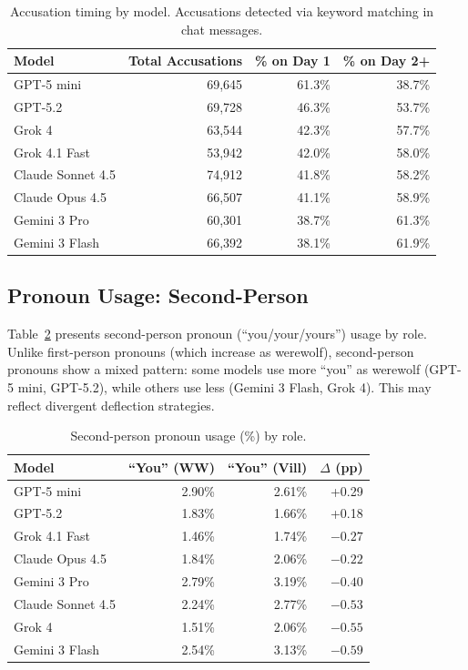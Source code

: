 \begin{table}[ht]
\caption{Accusation timing by model. Accusations detected via keyword matching in chat messages.}
\label{tab:accusations}
\centering
\small
\begin{tabular}{lrrr}
\toprule
\textbf{Model} & \textbf{Total Accusations} & \textbf{\% on Day 1} & \textbf{\% on Day 2+} \\
\midrule
GPT-5 mini              & 69,645 & 61.3\% & 38.7\% \\
GPT-5.2                 & 69,728 & 46.3\% & 53.7\% \\
Grok 4                  & 63,544 & 42.3\% & 57.7\% \\
Grok 4.1 Fast           & 53,942 & 42.0\% & 58.0\% \\
Claude Sonnet 4.5       & 74,912 & 41.8\% & 58.2\% \\
Claude Opus 4.5         & 66,507 & 41.1\% & 58.9\% \\
Gemini 3 Pro            & 60,301 & 38.7\% & 61.3\% \\
Gemini 3 Flash          & 66,392 & 38.1\% & 61.9\% \\
\bottomrule
\end{tabular}
\end{table}


\subsection{Pronoun Usage: Second-Person}
\label{app:second_person}

Table~\ref{tab:second_person} presents second-person pronoun (``you/your/yours'') usage by role. Unlike first-person pronouns (which increase as werewolf), second-person pronouns show a mixed pattern: some models use more ``you'' as werewolf (GPT-5 mini, GPT-5.2), while others use less (Gemini 3 Flash, Grok 4). This may reflect divergent deflection strategies.

\begin{table}[ht]
\caption{Second-person pronoun usage (\%) by role.}
\label{tab:second_person}
\centering
\small
\begin{tabular}{lrrr}
\toprule
\textbf{Model} & \textbf{``You'' (WW)} & \textbf{``You'' (Vill)} & \textbf{$\Delta$ (pp)} \\
\midrule
GPT-5 mini              & 2.90\% & 2.61\% & +0.29 \\
GPT-5.2                 & 1.83\% & 1.66\% & +0.18 \\
Grok 4.1 Fast           & 1.46\% & 1.74\% & $-0.27$ \\
Claude Opus 4.5         & 1.84\% & 2.06\% & $-0.22$ \\
Gemini 3 Pro            & 2.79\% & 3.19\% & $-0.40$ \\
Claude Sonnet 4.5       & 2.24\% & 2.77\% & $-0.53$ \\
Grok 4                  & 1.51\% & 2.06\% & $-0.55$ \\
Gemini 3 Flash          & 2.54\% & 3.13\% & $-0.59$ \\
\bottomrule
\end{tabular}
\end{table}


